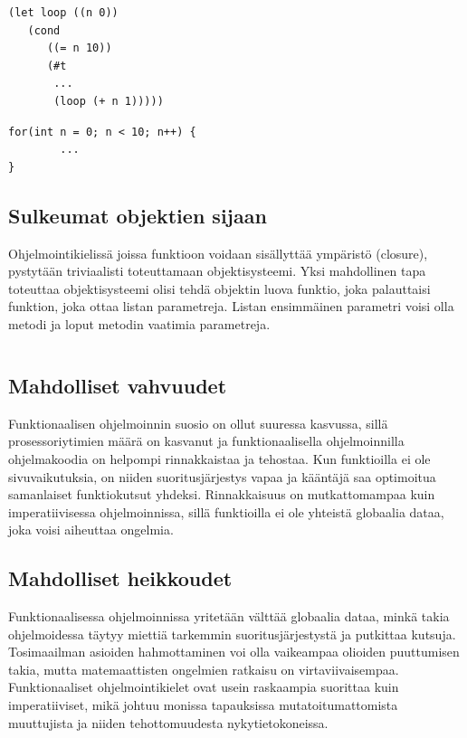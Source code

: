 \documentclass[12pt]{article}
\begin{document}
\begin{lstlisting}
(let loop ((n 0))
   (cond
      ((= n 10))
      (#t
       ...
       (loop (+ n 1)))))      
\end{lstlisting}
\begin{lstlisting}
for(int n = 0; n < 10; n++) {
        ...
}
\end{lstlisting}


\subsection{Sulkeumat objektien sijaan}
Ohjelmointikielissä joissa funktioon voidaan sisällyttää ympäristö (closure), pystytään triviaalisti toteuttamaan objektisysteemi.
Yksi mahdollinen tapa toteuttaa objektisysteemi olisi tehdä objektin luova funktio, joka palauttaisi funktion, joka ottaa listan parametreja.
Listan ensimmäinen parametri voisi olla metodi ja loput metodin vaatimia parametreja.
\begin{lstlisting}

\end{lstlisting}


\subsection{Mahdolliset vahvuudet}
Funktionaalisen ohjelmoinnin suosio on ollut suuressa kasvussa, sillä prosessoriytimien määrä on kasvanut ja funktionaalisella ohjelmoinnilla ohjelmakoodia on helpompi rinnakkaistaa ja tehostaa. Kun funktioilla ei ole sivuvaikutuksia, on niiden suoritusjärjestys vapaa ja kääntäjä saa optimoitua samanlaiset funktiokutsut yhdeksi. Rinnakkaisuus on mutkattomampaa kuin imperatiivisessa ohjelmoinnissa, sillä funktioilla ei ole yhteistä globaalia dataa, joka voisi aiheuttaa ongelmia.

\subsection{Mahdolliset heikkoudet}
Funktionaalisessa ohjelmoinnissa yritetään välttää globaalia dataa, minkä takia ohjelmoidessa täytyy miettiä tarkemmin suoritusjärjestystä ja putkittaa kutsuja. Tosimaailman asioiden hahmottaminen voi olla vaikeampaa olioiden puuttumisen takia, mutta matemaattisten ongelmien ratkaisu on virtaviivaisempaa. Funktionaaliset ohjelmointikielet ovat usein raskaampia suorittaa kuin imperatiiviset, mikä johtuu monissa tapauksissa mutatoitumattomista muuttujista ja niiden tehottomuudesta nykytietokoneissa.
\end{document}
